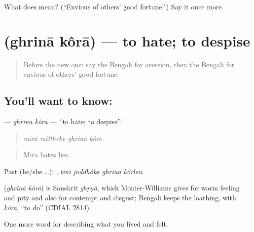\begin{tcolorbox}[breakable,colback=teal!4,colframe=teal!35!black,title={Before you move on}]
What does  mean? (\textquotedblleft{}Envious of others' good fortune\textquotedblright{}.) Say it once more.
\end{tcolorbox}
\section[\texorpdfstring{\bn{ঘৃণা} \bn{করা} (ghrinā kôrā)}{ঘৃণা করা (ghrinā kôrā)}]{  (ghrinā kôrā) — to hate; to despise}

\label{lesson:BN-C451-ghrina-kora}



\begin{quote}
Before the new one: say the Bengali for aversion, then the Bengali for envious of others' good fortune.
\end{quote}

\subsection*{You'll want to know:  }
\textbf{ } — \emph{ghrinā kôrā} — \textquotedblleft{}to hate; to despise\textquotedblright{}.

\begin{quote}
   
\end{quote}

\begin{quote}
\emph{mīrā mittheke ghrinā kôre.}
\end{quote}

\begin{quote}
Mira hates lies.
\end{quote}

Past (he/she …):    , \emph{tini juddhôke ghrinā kôrlen}.

\begin{cousinweb}
\textbf{ } (\emph{ghrinā kôrā}) is Sanskrit \emph{ghṛṇā}, which Monier-Williams gives for warm feeling and pity and also for contempt and disgust; Bengali keeps the loathing, with \emph{kôrā}, \textquotedblleft{}to do\textquotedblright{} (CDIAL 2814).
\end{cousinweb}

\begin{grammarlens}[title={What you've built}]
One more word for describing what you lived and felt.
\end{grammarlens}

